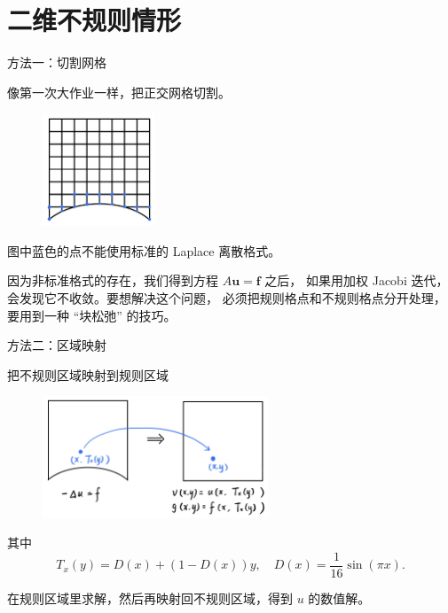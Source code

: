 \documentclass[9pt]{beamer}
\begin{document}
\section{二维不规则情形}

\begin{frame}{方法一：切割网格}

像第一次大作业一样，把正交网格切割。

\begin{figure}[H]
  \centering
  \includegraphics[width=0.3\textwidth]{pic/Irregular_CutCell.jpg}
\end{figure}

图中蓝色的点不能使用标准的 Laplace 离散格式。

\pause\vspace{1em}

因为非标准格式的存在，我们得到方程 $A\mathbf{u}=\mathbf{f}$ 之后，
如果用加权 Jacobi 迭代，会发现它不收敛。要想解决这个问题，
必须把规则格点和不规则格点分开处理，
要用到一种 “块松弛” 的技巧。

\end{frame}

\begin{frame}{方法二：区域映射}

把不规则区域映射到规则区域

\begin{figure}[H]
  \centering
  \includegraphics[width=0.6\textwidth]{pic/Irregular_Mapping.jpg}
\end{figure}

其中
\begin{equation*}
	T_x(y) = D(x) + (1-D(x))y,\quad D(x)=\frac{1}{16}\sin(\pi x).
\end{equation*}

在规则区域里求解，然后再映射回不规则区域，得到 $u$ 的数值解。

\end{frame}
\end{document}
